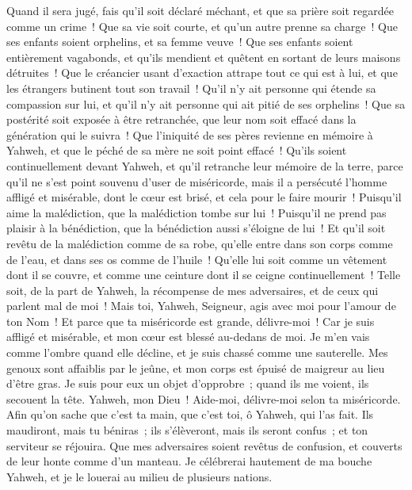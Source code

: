 \begin{multicols}{2}
Quand il sera jugé, fais qu'il soit déclaré méchant, et que sa prière soit regardée comme un crime~!
Que sa vie soit courte, et qu'un autre prenne sa charge~!
Que ses enfants soient orphelins, et sa femme veuve~!
Que ses enfants soient entièrement vagabonds, et qu'ils mendient et quêtent en sortant de leurs maisons détruites~!
Que le créancier usant d'exaction attrape tout ce qui est à lui, et que les étrangers butinent tout son travail~!
Qu'il n'y ait personne qui étende sa compassion sur lui, et qu'il n'y ait personne qui ait pitié de ses orphelins~!
Que sa postérité soit exposée à être retranchée, que leur nom soit effacé dans la génération qui le suivra~!
Que l'iniquité de ses pères revienne en mémoire à Yahweh, et que le péché de sa mère ne soit point effacé~!
Qu'ils soient continuellement devant Yahweh, et qu'il retranche leur mémoire de la terre,
parce qu'il ne s'est point souvenu d'user de miséricorde, mais il a persécuté l'homme affligé et misérable, dont le cœur est brisé, et cela pour le faire mourir~!
Puisqu'il aime la malédiction, que la malédiction tombe sur lui~! Puisqu'il ne prend pas plaisir à la bénédiction, que la bénédiction aussi s'éloigne de lui~!
Et qu'il soit revêtu de la malédiction comme de sa robe, qu'elle entre dans son corps comme de l'eau, et dans ses os comme de l'huile~!
Qu'elle lui soit comme un vêtement dont il se couvre, et comme une ceinture dont il se ceigne continuellement~!
Telle soit, de la part de Yahweh, la récompense de mes adversaires, et de ceux qui parlent mal de moi~!
Mais toi, Yahweh, Seigneur, agis avec moi pour l'amour de ton Nom~! Et parce que ta miséricorde est grande, délivre-moi~!
Car je suis affligé et misérable, et mon cœur est blessé au-dedans de moi.
Je m'en vais comme l'ombre quand elle décline, et je suis chassé comme une sauterelle.
Mes genoux sont affaiblis par le jeûne, et mon corps est épuisé de maigreur au lieu d'être gras.
Je suis pour eux un objet d'opprobre~; quand ils me voient, ils secouent la tête.
Yahweh, mon Dieu~! Aide-moi, délivre-moi selon ta miséricorde.
Afin qu'on sache que c'est ta main, que c'est toi, ô Yahweh, qui l'as fait.
Ils maudiront, mais tu béniras~; ils s'élèveront, mais ils seront confus~; et ton serviteur se réjouira.
Que mes adversaires soient revêtus de confusion, et couverts de leur honte comme d'un manteau.
Je célébrerai hautement de ma bouche Yahweh, et je le louerai au milieu de plusieurs nations.

\end{multicols}
